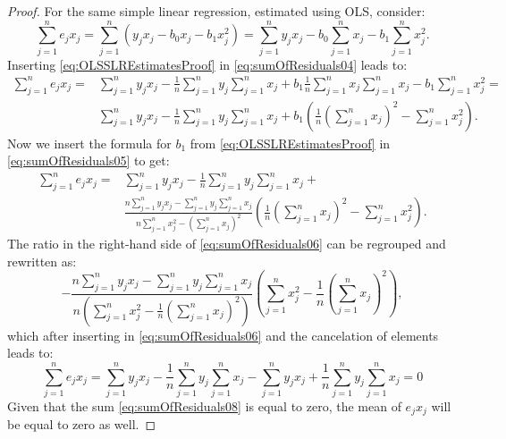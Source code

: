 \documentclass[
]{book}
\theoremstyle{definition}
\theoremstyle{definition}
\theoremstyle{definition}
\theoremstyle{definition}
\theoremstyle{remark}
\begin{document}
\begin{proof}
For the same simple linear regression, estimated using OLS, consider:
\begin{equation}
    \sum_{j=1}^n e_j x_j = \sum_{j=1}^n (y_j x_j -b_0 x_j -b_1 x_j^2) = \sum_{j=1}^n y_j x_j -b_0 \sum_{j=1}^n x_j -b_1 \sum_{j=1}^n x_j^2 .
    \label{eq:sumOfResiduals04}
\end{equation}
Inserting \eqref{eq:OLSSLREstimatesProof} in \eqref{eq:sumOfResiduals04} leads to:
\begin{equation}
    \begin{aligned}
        \sum_{j=1}^n e_j x_j = & \sum_{j=1}^n y_j x_j - \frac{1}{n}\sum_{j=1}^n y_j \sum_{j=1}^n x_j + b_1 \frac{1}{n}\sum_{j=1}^n x_j \sum_{j=1}^n x_j - b_1 \sum_{j=1}^n x_j^2 = \\
                               & \sum_{j=1}^n y_j x_j - \frac{1}{n}\sum_{j=1}^n y_j \sum_{j=1}^n x_j + b_1 \left( \frac{1}{n} \left(\sum_{j=1}^n x_j \right)^2 - \sum_{j=1}^n x_j^2 \right) .
    \end{aligned}
    \label{eq:sumOfResiduals05}
\end{equation}
Now we insert the formula for \(b_1\) from \eqref{eq:OLSSLREstimatesProof} in \eqref{eq:sumOfResiduals05} to get:
\begin{equation}
    \begin{aligned}
        \sum_{j=1}^n e_j x_j = & \sum_{j=1}^n y_j x_j - \frac{1}{n}\sum_{j=1}^n y_j \sum_{j=1}^n x_j + \\
         & \frac{n \sum_{j=1}^n y_j x_j - \sum_{j=1}^n y_j \sum_{j=1}^n x_j}{n \sum_{j=1}^n x_j^2 - \left(\sum_{j=1}^n x_j \right)^2} \left( \frac{1}{n} \left(\sum_{j=1}^n x_j \right)^2 - \sum_{j=1}^n x_j^2 \right) .
    \end{aligned}
    \label{eq:sumOfResiduals06}
\end{equation}
The ratio in the right-hand side of \eqref{eq:sumOfResiduals06} can be regrouped and rewritten as:
\begin{equation}
        -\frac{n \sum_{j=1}^n y_j x_j - \sum_{j=1}^n y_j \sum_{j=1}^n x_j}{n \left( \sum_{j=1}^n x_j^2 - \frac{1}{n}\left(\sum_{j=1}^n x_j \right)^2 \right)} \left( \sum_{j=1}^n x_j^2 - \frac{1}{n} \left(\sum_{j=1}^n x_j\right)^2 \right) ,
    \label{eq:sumOfResiduals07}
\end{equation}
which after inserting in \eqref{eq:sumOfResiduals06} and the cancelation of elements leads to:
\begin{equation}
    \sum_{j=1}^n e_j x_j = \sum_{j=1}^n y_j x_j - \frac{1}{n}\sum_{j=1}^n y_j \sum_{j=1}^n x_j - \sum_{j=1}^n y_j x_j + \frac{1}{n} \sum_{j=1}^n y_j \sum_{j=1}^n x_j = 0
    \label{eq:sumOfResiduals08}
\end{equation}
Given that the sum \eqref{eq:sumOfResiduals08} is equal to zero, the mean of \(e_j x_j\) will be equal to zero as well.
\end{proof}
\end{document}
